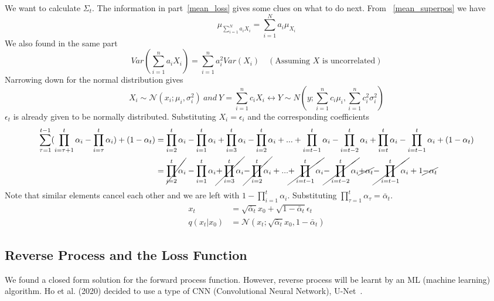 \documentclass{book}
\numberwithin{equation}{subsection}
\begin{document}
We want to calculate $\Sigma_t$. The information in part~\ref{mean_loss} gives some clues on what to do next. From ~\ref{mean_superpos} we have
\begin{equation}
    \mu_{\sum_{i=1}^N a_i X_i} = \sum_{i=1}^N a_i \mu_{X_i}
\end{equation}
We also found in the same part
\begin{equation}
    Var(\sum_{i=1}^{n} a_i X_i) = \sum_{i=1}^{n} a_i^2 Var(X_i) \quad (\text{Assuming $X$ is uncorrelated})
    \label{varsum}
\end{equation}
Narrowing down for the normal distribution gives
\begin{equation}
    X_i \sim \mathcal{N}(x_i; \mu_i, \sigma_i^2)\ and\ Y = \sum_{i=1}^{n}c_iX_i \longleftrightarrow Y \sim N(y; \sum_{i=1}^{n}c_i\mu_i,\sum_{i=1}^{n}c_i^2\sigma_i^2)
\end{equation}
$\epsilon_t$ is already given to be normally distributed. Substituting $X_i = \epsilon_i$ and the corresponding coefficients 
\begin{align}
    \sum_{\tau=1}^{t-1}(\prod_{i=\tau+1}^{t}\alpha_i-\prod_{i=\tau}^{t}\alpha_i)+(1-\alpha_t) &= \prod_{i=2}^{t}\alpha_i-\prod_{i=1}^{t}\alpha_i+\prod_{i=3}^{t}\alpha_i-\prod_{i=2}^{t}\alpha_i+...+\prod_{i=t-1}^{t}\alpha_i-\prod_{i=t-2}^{t}\alpha_i+\prod_{i=t}^{t}\alpha_i-\prod_{i=t-1}^{t}\alpha_i+(1-\alpha_t)\\
    &= \cancel{\prod_{i=2}^{t}\alpha_i}-\prod_{i=1}^{t}\alpha_i\cancel{+\prod_{i=3}^{t}\alpha_i}\cancel{-\prod_{i=2}^{t}\alpha_i}+...\cancel{+\prod_{i=t-1}^{t}\alpha_i}\cancel{-\prod_{i=t-2}^{t}\alpha_i}\cancel{+\alpha_t}\cancel{-\prod_{i=t-1}^{t}\alpha_i}+1\cancel{-\alpha_t}
\end{align}
Note that similar elements cancel each other and we are left with $1-\prod_{i=1}^{t}\alpha_i$. Substituting $\prod_{\tau=1}^{t}\alpha_\tau = \bar{\alpha}_t$.
\begin{align}
    x_t &= \sqrt{\bar{\alpha}_t}x_0 + \sqrt{1 - \bar{\alpha}_t}\epsilon_t\label{reparam_xt}\\
    q(x_t|x_0) &= \mathcal{N}(x_t;\sqrt{\bar{\alpha}_t}x_0,1 - \bar{\alpha}_t)
\end{align}
\subsection{Reverse Process and the Loss Function}
We found a closed form solution for the forward process function. However, reverse process will be learnt by an ML (machine learning) algorithm. Ho et al. (2020) decided to use a type of CNN (Convolutional Neural Network), U-Net~\cite{ho_denoising_2020}.
\end{document}
